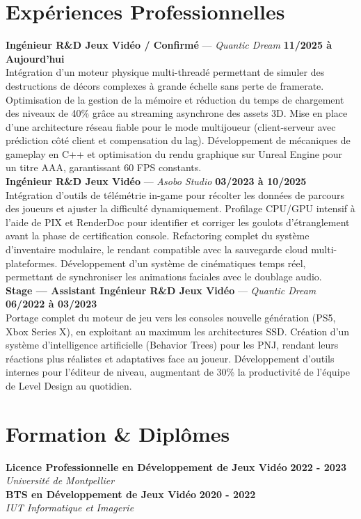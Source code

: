 \documentclass[11pt,a4paper]{article}
\begin{document}
\section*{Expériences Professionnelles}
\noindent \textbf{Ingénieur R\&D Jeux Vidéo / Confirmé} --- \textit{Quantic Dream} \hfill \textbf{11/2025 à Aujourd'hui} \\
Intégration d'un moteur physique multi-threadé permettant de simuler des destructions de décors complexes à grande échelle sans perte de framerate. Optimisation de la gestion de la mémoire et réduction du temps de chargement des niveaux de 40\% grâce au streaming asynchrone des assets 3D. Mise en place d'une architecture réseau fiable pour le mode multijoueur (client-serveur avec prédiction côté client et compensation du lag). Développement de mécaniques de gameplay en C++ et optimisation du rendu graphique sur Unreal Engine pour un titre AAA, garantissant 60 FPS constants. \\[0.3cm]
\noindent \textbf{Ingénieur R\&D Jeux Vidéo} --- \textit{Asobo Studio} \hfill \textbf{03/2023 à 10/2025} \\
Intégration d'outils de télémétrie in-game pour récolter les données de parcours des joueurs et ajuster la difficulté dynamiquement. Profilage CPU/GPU intensif à l'aide de PIX et RenderDoc pour identifier et corriger les goulots d'étranglement avant la phase de certification console. Refactoring complet du système d'inventaire modulaire, le rendant compatible avec la sauvegarde cloud multi-plateformes. Développement d'un système de cinématiques temps réel, permettant de synchroniser les animations faciales avec le doublage audio. \\[0.3cm]
\noindent \textbf{Stage — Assistant Ingénieur R\&D Jeux Vidéo} --- \textit{Quantic Dream} \hfill \textbf{06/2022 à 03/2023} \\
Portage complet du moteur de jeu vers les consoles nouvelle génération (PS5, Xbox Series X), en exploitant au maximum les architectures SSD. Création d'un système d'intelligence artificielle (Behavior Trees) pour les PNJ, rendant leurs réactions plus réalistes et adaptatives face au joueur. Développement d'outils internes pour l'éditeur de niveau, augmentant de 30\% la productivité de l'équipe de Level Design au quotidien. \\[0.3cm]


\vspace{0.3cm}

\section*{Formation \& Diplômes}
\noindent \textbf{Licence Professionnelle en Développement de Jeux Vidéo} \hfill \textbf{2022 - 2023} \\
\textit{Université de Montpellier} \\[0.3cm]
\noindent \textbf{BTS en Développement de Jeux Vidéo} \hfill \textbf{2020 - 2022} \\
\textit{IUT Informatique et Imagerie} \\[0.3cm]
\end{document}
